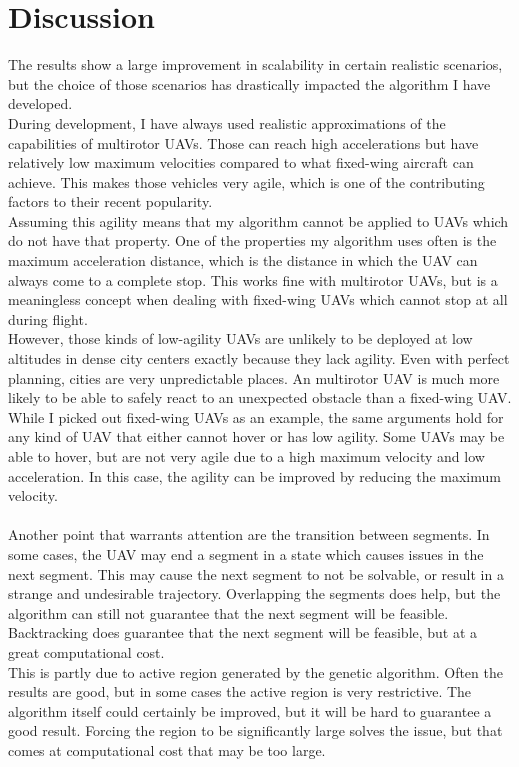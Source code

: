 \section{Discussion}
The results show a large improvement in scalability in certain realistic scenarios, but the choice of those scenarios has drastically impacted the algorithm I have developed. \\
During development, I have always used realistic approximations of the capabilities of multirotor UAVs. Those can reach high accelerations but have relatively low maximum velocities compared to what fixed-wing aircraft can achieve. This makes those vehicles very agile, which is one of the contributing factors to their recent popularity. \\
Assuming this agility means that my algorithm cannot be applied to UAVs which do not have that property. One of the properties my algorithm uses often is the maximum acceleration distance, which is the distance in which the UAV can always come to a complete stop. This works fine with multirotor UAVs, but is a meaningless concept when dealing with fixed-wing UAVs which cannot stop at all during flight. \\
However, those kinds of low-agility UAVs are unlikely to be deployed at low altitudes in dense city centers exactly because they lack agility. Even with perfect planning, cities are very unpredictable places. An multirotor UAV is much more likely to be able to safely react to an unexpected obstacle than a fixed-wing UAV. \\
While I picked out fixed-wing UAVs as an example, the same arguments hold for any kind of UAV that either cannot hover or has low agility. Some UAVs may be able to hover, but are not very agile due to a high maximum velocity and low acceleration. In this case, the agility can be improved by reducing the maximum velocity.\\ \\

Another point that warrants attention are the transition between segments. In some cases, the UAV may end a segment in a state which causes issues in the next segment. This may cause the next segment to not be solvable, or result in a strange and undesirable trajectory. Overlapping the segments does help, but the algorithm can still not guarantee that the next segment will be feasible. Backtracking does guarantee that the next segment will be feasible, but at a great computational cost.\\
This is partly due to active region generated by the genetic algorithm. Often the results are good, but in some cases the active region is very restrictive. The algorithm itself could certainly be improved, but it will be hard to guarantee a good result. Forcing the region to be significantly large solves the issue, but that comes at computational cost that may be too large.\\

